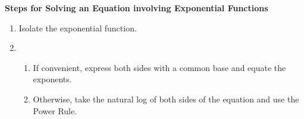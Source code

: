 \smallskip

\colorbox{ResultColor}{\bbm

\centerline{\textbf{Steps for Solving an Equation involving Exponential Functions}} 

\begin{enumerate}

\item  Isolate the exponential function.

\item  

\begin{enumerate}

\item  If convenient, express both sides with a common base and equate the exponents.

\item  Otherwise, take the natural log of both sides of the equation and use the Power Rule.


\end{enumerate}


\end{enumerate}

\ebm}

\smallskip


